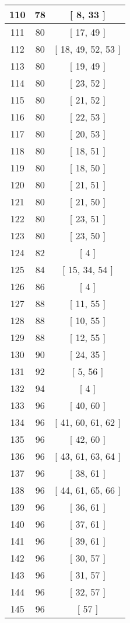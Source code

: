 \begin{center}
\begin{longtable}[H]{|| c c c ||}
\hline
110 & 78 & [ 8, 33 ] \\ 
\hline
111 & 80 & [ 17, 49 ] \\ 
\hline
112 & 80 & [ 18, 49, 52, 53 ] \\ 
\hline
113 & 80 & [ 19, 49 ] \\ 
\hline
114 & 80 & [ 23, 52 ] \\ 
\hline
115 & 80 & [ 21, 52 ] \\ 
\hline
116 & 80 & [ 22, 53 ] \\ 
\hline
117 & 80 & [ 20, 53 ] \\ 
\hline
118 & 80 & [ 18, 51 ] \\ 
\hline
119 & 80 & [ 18, 50 ] \\ 
\hline
120 & 80 & [ 21, 51 ] \\ 
\hline
121 & 80 & [ 21, 50 ] \\ 
\hline
122 & 80 & [ 23, 51 ] \\ 
\hline
123 & 80 & [ 23, 50 ] \\ 
\hline
124 & 82 & [ 4 ] \\ 
\hline
125 & 84 & [ 15, 34, 54 ] \\ 
\hline
126 & 86 & [ 4 ] \\ 
\hline
127 & 88 & [ 11, 55 ] \\ 
\hline
128 & 88 & [ 10, 55 ] \\ 
\hline
129 & 88 & [ 12, 55 ] \\ 
\hline
130 & 90 & [ 24, 35 ] \\ 
\hline
131 & 92 & [ 5, 56 ] \\ 
\hline
132 & 94 & [ 4 ] \\ 
\hline
133 & 96 & [ 40, 60 ] \\ 
\hline
134 & 96 & [ 41, 60, 61, 62 ] \\ 
\hline
135 & 96 & [ 42, 60 ] \\ 
\hline
136 & 96 & [ 43, 61, 63, 64 ] \\ 
\hline
137 & 96 & [ 38, 61 ] \\ 
\hline
138 & 96 & [ 44, 61, 65, 66 ] \\ 
\hline
139 & 96 & [ 36, 61 ] \\ 
\hline
140 & 96 & [ 37, 61 ] \\ 
\hline
141 & 96 & [ 39, 61 ] \\ 
\hline
142 & 96 & [ 30, 57 ] \\ 
\hline
143 & 96 & [ 31, 57 ] \\ 
\hline
144 & 96 & [ 32, 57 ] \\ 
\hline
145 & 96 & [ 57 ] \\ 

\end{longtable}
\end{center}
